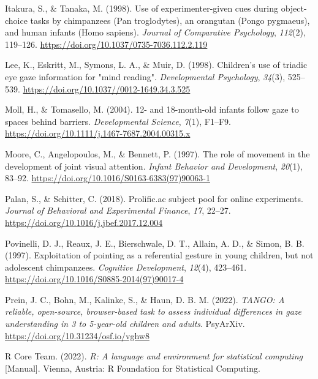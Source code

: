 \documentclass[
  man,floatsintext]{apa6}
\newlength{\cslhangindent}
\newlength{\cslentryspacingunit} %
\newenvironment{CSLReferences}[2] %
 {%
  \setlength{\parindent}{0pt}
  \ifodd #1
  \let\oldpar\par
  \def\par{\hangindent=\cslhangindent\oldpar}
  \fi
  \setlength{\parskip}{#2\cslentryspacingunit}
 }%
 {}
\begin{document}
\begin{CSLReferences}{1}{0}
\leavevmode{}%
Itakura, S., \& Tanaka, M. (1998). Use of experimenter-given cues during object-choice tasks by chimpanzees ({Pan} troglodytes), an orangutan ({Pongo} pygmaeus), and human infants ({Homo} sapiens). \emph{Journal of Comparative Psychology}, \emph{112}(2), 119--126. \url{https://doi.org/10.1037/0735-7036.112.2.119}

\leavevmode{}%
Lee, K., Eskritt, M., Symons, L. A., \& Muir, D. (1998). Children's use of triadic eye gaze information for "mind reading". \emph{Developmental Psychology}, \emph{34}(3), 525--539. \url{https://doi.org/10.1037//0012-1649.34.3.525}

\leavevmode{}%
Moll, H., \& Tomasello, M. (2004). 12- and 18-month-old infants follow gaze to spaces behind barriers. \emph{Developmental Science}, \emph{7}(1), F1--F9. \url{https://doi.org/10.1111/j.1467-7687.2004.00315.x}

\leavevmode{}%
Moore, C., Angelopoulos, M., \& Bennett, P. (1997). The role of movement in the development of joint visual attention. \emph{Infant Behavior and Development}, \emph{20}(1), 83--92. \url{https://doi.org/10.1016/S0163-6383(97)90063-1}

\leavevmode{}%
Palan, S., \& Schitter, C. (2018). Prolific.ac subject pool for online experiments. \emph{Journal of Behavioral and Experimental Finance}, \emph{17}, 22--27. \url{https://doi.org/10.1016/j.jbef.2017.12.004}

\leavevmode{}%
Povinelli, D. J., Reaux, J. E., Bierschwale, D. T., Allain, A. D., \& Simon, B. B. (1997). Exploitation of pointing as a referential gesture in young children, but not adolescent chimpanzees. \emph{Cognitive Development}, \emph{12}(4), 423--461. \url{https://doi.org/10.1016/S0885-2014(97)90017-4}

\leavevmode{}%
Prein, J. C., Bohn, M., Kalinke, S., \& Haun, D. B. M. (2022). \emph{{TANGO}: {A} reliable, open-source, browser-based task to assess individual differences in gaze understanding in 3 to 5-year-old children and adults}. {PsyArXiv}. \url{https://doi.org/10.31234/osf.io/vghw8}

\leavevmode{}%
R Core Team. (2022). \emph{R: {A} language and environment for statistical computing} {[}Manual{]}. {Vienna, Austria}: {R Foundation for Statistical Computing}.


\end{CSLReferences}
\end{document}

